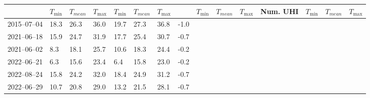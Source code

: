 \documentclass[12pt,a4paper, english,twoside]{article}
\begin{document}
\begin{landscape}
\begin{table}[ht]
\begin{tabular}{l lll lll l llll lll}
        & $T_{\min}$ & $T_{mean}$ & $T_{\max}$ & $T_{\min}$ & $T_{mean}$ & $T_{\max}$ & & 
       $T_{\min}$ & $T_{mean}$ & $T_{\max}$ & Num. UHI & $T_{\min}$ & $T_{mean}$ & $T_{\max}$ \\
           \midrule
      2015--07--04 & 18.3 & 26.3 & 36.0 & 19.7 & 27.3 & 36.8 & -1.0 & & & & & & & \\
      2021--06--18 & 15.9 & 24.7 & 31.9 & 17.7 & 25.4 & 30.7 & -0.7 & & & & & & & \\
      2021--06--02 & 8.3  & 18.1 & 25.7 & 10.6 & 18.3 & 24.4 & -0.2 & & & & & & & \\
      2022--06--21 & 6.3  & 15.6 & 23.4 & 6.4  & 15.8 & 23.0 & -0.2 & & & & & & & \\
      2022--08--24 & 15.8 & 24.2 & 32.0 & 18.4 & 24.9 & 31.2 & -0.7 & & & & & & & \\
      2022--06--29 & 10.7 & 20.8 & 29.0 & 13.2 & 21.5 & 28.1 & -0.7 & & & & & & & \\
      \bottomrule
    \end{tabular}
  \end{table}
\end{landscape}

%
%
\newpage
\end{document}
